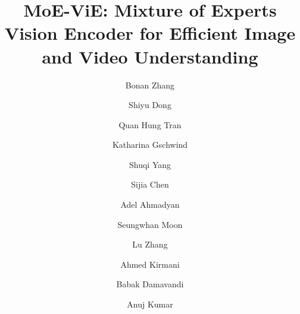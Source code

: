 \documentclass[runningheads]{llncs}
\begin{document}
\title{MoE-ViE: Mixture of Experts Vision Encoder for Efficient Image and Video Understanding}


\author{Bonan Zhang \and
Shiyu Dong \and
Quan Hung Tran \and 
Katharina Gschwind\inst{\star} \and
Shuqi Yang\inst{\star} \and
Sijia Chen\inst{\star} \and
Adel Ahmadyan \and
Seungwhan Moon \and
Lu Zhang \and
Ahmed Kirmani \and
Babak Damavandi \and 
Anuj Kumar 
}



\maketitle
\end{document}
